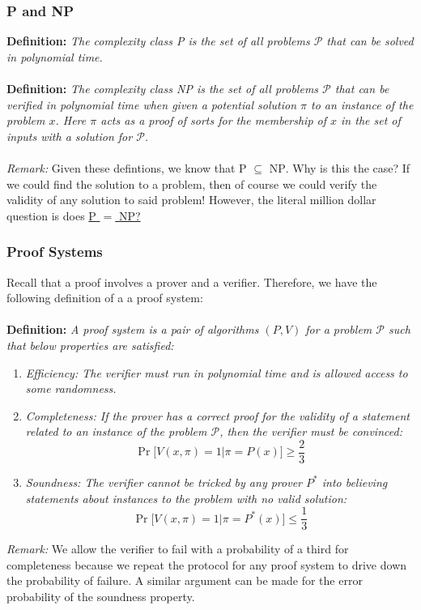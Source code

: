 \documentclass{article}
\begin{document}
\subsubsection{\textsc{P} and \textsc{NP}}
\textbf{Definition:} \textit{The complexity class \textsc{P} is the set of all problems $\mathcal{P}$ that can be solved in polynomial time.} \\ \\
\textbf{Definition:} \textit{The complexity class \textsc{NP} is the set of all problems $\mathcal{P}$ that can be verified in polynomial time when given a potential solution $\pi$ to an instance of the problem $x$. Here $\pi$ acts as a proof of sorts for the membership of $x$ in the set of inputs with a solution for $\mathcal{P}$.} \\ \\
\noindent \textit{Remark:} Given these defintions, we know that \textsc{P} $\subseteq$ \textsc{NP}. Why is this the case? If we could find the solution to a problem, then of course we could verify the validity of any solution to said problem! However, the literal million dollar question is does \href{https://en.wikipedia.org/wiki/P_versus_NP_problem}{\textsc{P} $=$ \textsc{NP}?}
\subsubsection{Proof Systems}
Recall that a proof involves a prover and a verifier. Therefore, we have the following definition of a a proof system: \\ \\
\textbf{Definition:} \textit{A proof system is a pair of algorithms $(P, V)$ for a problem $\mathcal{P}$ such that below properties are satisfied:}
    \begin{enumerate}
        \item \textit{Efficiency: The verifier must run in polynomial time and is allowed access to some randomness.}
        \item \textit{Completeness: If the prover has a correct proof for the validity of a statement related to an instance of the problem $\mathcal{P}$, then the verifier must be convinced:}
        $$\Pr\bigg[V(x, \pi) = 1 \Bigg\vert \pi = P(x)\bigg] \geq \frac{2}{3}$$
        \item \textit{Soundness: The verifier cannot be tricked by any prover $P^*$ into believing statements about instances to the problem with no valid solution:}
        $$\Pr\bigg[V(x, \pi) = 1 \Bigg\vert \pi = P^*(x)\bigg] \leq \frac{1}{3}$$
    \end{enumerate}
\noindent \textit{Remark:} We allow the verifier to fail with a probability of a third for completeness because we repeat the protocol for any proof system to drive down the probability of failure. A similar argument can be made for the error probability of the soundness property. \\ \\
\end{document}
